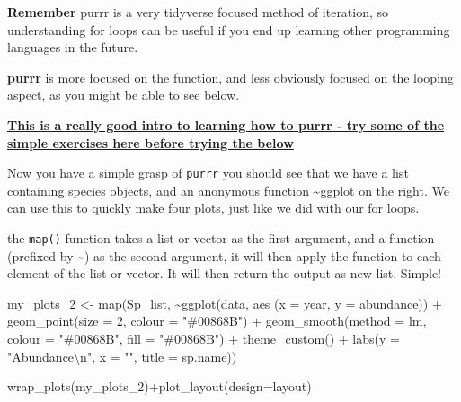 \documentclass[
]{book}
\newenvironment{Shaded}{\begin{snugshade}}{\end{snugshade}}
\newcommand{\AttributeTok}[1]{\textcolor[rgb]{0.77,0.63,0.00}{#1}}
\newcommand{\DecValTok}[1]{\textcolor[rgb]{0.00,0.00,0.81}{#1}}
\newcommand{\FunctionTok}[1]{\textcolor[rgb]{0.00,0.00,0.00}{#1}}
\newcommand{\NormalTok}[1]{#1}
\newcommand{\OtherTok}[1]{\textcolor[rgb]{0.56,0.35,0.01}{#1}}
\newcommand{\SpecialCharTok}[1]{\textcolor[rgb]{0.00,0.00,0.00}{#1}}
\newcommand{\StringTok}[1]{\textcolor[rgb]{0.31,0.60,0.02}{#1}}
\begin{document}
\textbf{Remember} purrr is a very tidyverse focused method of iteration, so understanding for loops can be useful if you end up learning other programming languages in the future.

\textbf{purrr} is more focused on the function, and less obviously focused on the looping aspect, as you might be able to see below.

\href{https://www.rebeccabarter.com/blog/2019-08-19_purrr/}{\textbf{This is a really good intro to learning how to purrr - try some of the simple exercises here before trying the below}}

Now you have a simple grasp of \texttt{purrr} you should see that we have a list containing species objects, and an anonymous function \textasciitilde ggplot on the right. We can use this to quickly make four plots, just like we did with our for loops.

the \texttt{map()} function takes a list or vector as the first argument, and a function (prefixed by \textasciitilde) as the second argument, it will then apply the function to each element of the list or vector. It will then return the output as new list. Simple!

\begin{Shaded}
\begin{Highlighting}[]
\NormalTok{my\_plots\_2 }\OtherTok{\textless{}{-}} \FunctionTok{map}\NormalTok{(Sp\_list, }\SpecialCharTok{\textasciitilde{}}\FunctionTok{ggplot}\NormalTok{(data, }\FunctionTok{aes}\NormalTok{ (}\AttributeTok{x =}\NormalTok{ year, }\AttributeTok{y =}\NormalTok{ abundance)) }\SpecialCharTok{+}              
                      \FunctionTok{geom\_point}\NormalTok{(}\AttributeTok{size =} \DecValTok{2}\NormalTok{, }\AttributeTok{colour =} \StringTok{"\#00868B"}\NormalTok{) }\SpecialCharTok{+}                                                
                      \FunctionTok{geom\_smooth}\NormalTok{(}\AttributeTok{method =}\NormalTok{ lm, }\AttributeTok{colour =} \StringTok{"\#00868B"}\NormalTok{, }\AttributeTok{fill =} \StringTok{"\#00868B"}\NormalTok{) }\SpecialCharTok{+}          
                      \FunctionTok{theme\_custom}\NormalTok{() }\SpecialCharTok{+}
                      \FunctionTok{labs}\NormalTok{(}\AttributeTok{y =} \StringTok{"Abundance}\SpecialCharTok{\textbackslash{}n}\StringTok{"}\NormalTok{, }\AttributeTok{x =} \StringTok{""}\NormalTok{, }\AttributeTok{title =}\NormalTok{ sp.name)) }


\FunctionTok{wrap\_plots}\NormalTok{(my\_plots\_2)}\SpecialCharTok{+}\FunctionTok{plot\_layout}\NormalTok{(}\AttributeTok{design=}\NormalTok{layout)}
\end{Highlighting}
\end{Shaded}
\end{document}

